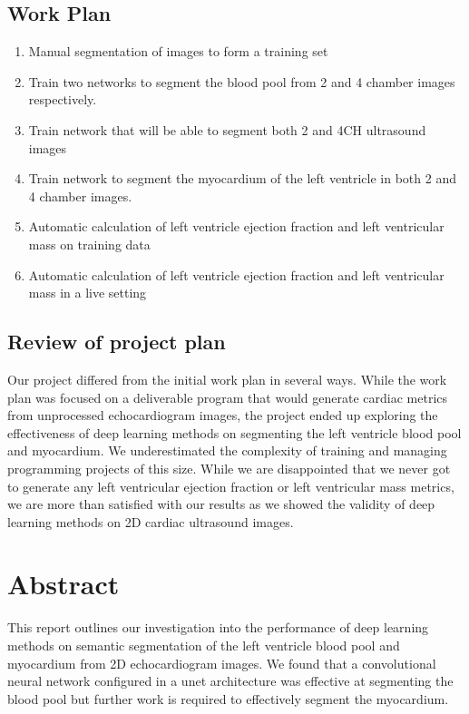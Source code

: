 \documentclass[12pt]{article}
\newcommand{\changelocaltocdepth}[1]{%
  \addtocontents{toc}{\protect\setcounter{tocdepth}{#1}}%
  \setcounter{tocdepth}{#1}%
}
\begin{document}
\subsection{Work Plan}
\begin{enumerate}
    \item{Manual segmentation of images to form a training set}
    \item{Train two networks to segment the blood pool from 2 and 4 chamber images respectively.}
    \item{Train network that will be able to segment both 2 and 4CH ultrasound images}
    \item{Train network to segment the myocardium of the left ventricle in both 2 and 4 chamber images.}
    \item{Automatic calculation of left ventricle ejection fraction and left ventricular mass on training data}
    \item{Automatic calculation of left ventricle ejection fraction and left ventricular mass in a live setting}
\end{enumerate}

\subsection{Review of project plan}
Our project differed from the initial work plan in several ways.
While the work plan was focused on a deliverable program that would generate cardiac metrics from unprocessed echocardiogram images,
the project ended up exploring the effectiveness of deep learning methods on segmenting the left ventricle blood pool and myocardium.
We underestimated the complexity of training and managing programming projects of this size.
While we are disappointed that we never got to generate any left ventricular ejection fraction or left ventricular mass metrics, we are more than satisfied with our results as we showed the validity of deep learning methods on 2D cardiac ultrasound images.

\newpage
\tableofcontents
\newpage

\doublespacing
{}
\setcounter{secnumdepth}{1}
\changelocaltocdepth{2}

\section{Abstract}
This report outlines our investigation into the performance of deep learning methods on semantic segmentation of the left ventricle blood pool and myocardium from 2D echocardiogram images.
We found that a convolutional neural network configured in a unet architecture was effective at segmenting the blood pool but further work is required to effectively segment the myocardium.
\end{document}
